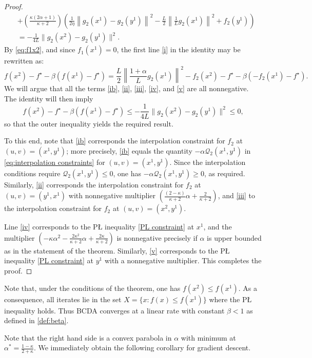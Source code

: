 \documentclass{article} %
\renewcommand{\leq}{\leqslant}
\begin{document}
\begin{proof}
\begin{align}
&+\left(\frac{\kappa(2\alpha+1)}{\kappa+2}\right)\left(\frac{1}{2\eta}\left\|g_2(x^1)-g_2(y^1)\right\|^2-\frac{L}{2}\left\|\frac{1}{L}g_2(x^1)\right\|^2+f_2(y^1)\right) \label{v}\\
&=-\frac{1}{4L}\|g_2(x^2)-g_2(y^1)\|^2. \nonumber
\end{align}
By \eqref{eq:f1x2}, and since $f_1(x^1) = 0$, the first line \eqref{i} in the identity may be rewritten as:
$$
f(x^2)-f^\star- \beta\left(f(x^1)-f^\star  \right) = \frac{L}{2}\left\|\frac{1+\alpha}{L}g_2(x^1)\right\|^2  -f_2(x^2)-f^\star -\beta\left( {-f_2(x^1)-f^\star} \right).
$$
We will argue that all the terms \eqref{ib}, \eqref{ii}, \eqref{iii}, \eqref{iv}, and \eqref{v} are all nonnegative.
The identity will then imply $$f(x^2)-f^\star- \beta\left(f(x^1)-f^\star  \right) \le -\frac{1}{4L}\|g_2(x^2)-g_2(y^1)\|^2 \le 0,$$
so that the outer inequality yields the required result.

To this end, note that \eqref{ib} corresponds the interpolation constraint for $f_2$ at $(u,v) = (x^1,y^1)$; more precisely, \eqref{ib} equals
 the quantity
$- \alpha \mathcal{Q}_2(x^1,y^1)$ in \eqref{eq:interpolation constraints}  for $(u,v) = (x^1,y^1)$. Since the interpolation conditions require
$\mathcal{Q}_2(x^1,y^1) \le 0$, one has $- \alpha \mathcal{Q}_2(x^1,y^1) \ge 0$, as required.
Similarly, \eqref{ii} corresponds the interpolation constraint for $f_2$ at $(u,v) = (y^1,x^1)$ with
nonnegative multiplier $\left(\frac{(2-\kappa)}{\kappa+2}\alpha + \frac{2}{\kappa+2}\right)$,
and \eqref{iii} to  the interpolation constraint for $f_2$ at $(u,v) = (x^2,y^1)$.

Line \eqref{iv} corresponds to the P{\L} inequality \eqref{PL constraint} at $x^1$, and the multiplier
 $\left(-\kappa\alpha^2 - \frac{2\kappa^2}{\kappa+2}\alpha + \frac{2\kappa}{\kappa+2}\right)$
is nonnegative precisely if $\alpha$ is upper bounded as in the statement of the theorem.
Similarly, \eqref{v} corresponds to the P{\L} inequality \eqref{PL constraint} at $y^1$ with a nonnegative multiplier.
This completes the proof.


\end{proof}

{ Note that, under the conditions of the theorem, one has $f(x^2) \le f(x^1)$. As a consequence, all iterates lie in the set $X=\{x: f(x)\leq f(x^1)\}$  where the P{\L} inequality holds. Thus BCDA converges at a linear rate with constant $\beta < 1$ as defined in \eqref{def:beta}.}


Note that the right hand side is a convex parabola in $\alpha$ with minimum at  $\alpha^* = \frac{1-\kappa}{2+\kappa}$.
We immediately obtain the following corollary for gradient descent.
\end{document}
